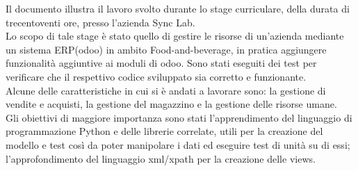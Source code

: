 
Il documento illustra il lavoro svolto durante lo stage curriculare, della durata di trecentoventi ore, presso l’azienda Sync Lab.\\
Lo scopo di tale stage è stato quello di gestire le risorse di un'azienda mediante un sistema ERP(odoo) in ambito Food-and-beverage, in pratica aggiungere funzionalità aggiuntive ai moduli di odoo.
Sono stati eseguiti dei test per verificare che il respettivo codice sviluppato sia corretto e funzionante.\\
Alcune delle caratteristiche in cui si è andati a lavorare sono: la gestione di vendite e acquisti, la gestione del magazzino e la gestione delle risorse umane.
\newline
\\
Gli obiettivi di maggiore importanza sono stati l'apprendimento del linguaggio di programmazione Python e delle librerie correlate, utili per la creazione del modello e test così da poter manipolare i dati ed eseguire test di unità su di essi; l'approfondimento del linguaggio xml/xpath per la creazione delle views.